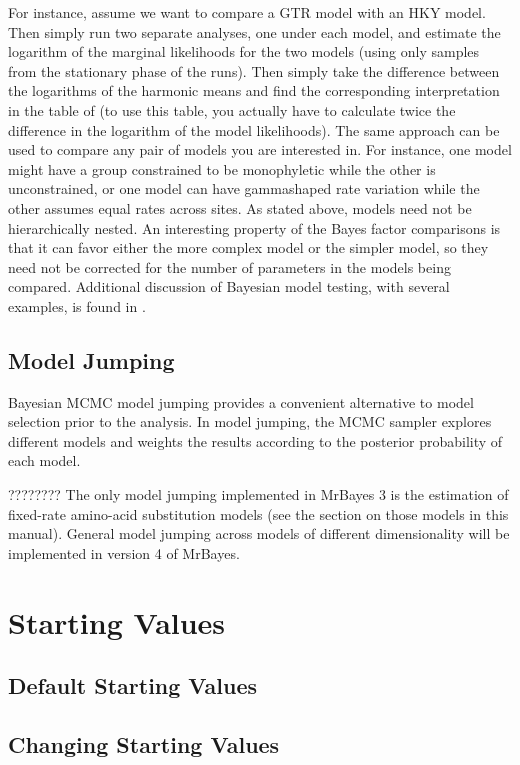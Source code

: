 \documentclass[12pt]{book}
\begin{document}
For instance, assume we want to compare a GTR model with an HKY model. Then simply run two separate
analyses, one under each model, and estimate the logarithm of the marginal likelihoods for the two
models (using only samples from the stationary phase of the runs). Then simply take the difference
between the logarithms of the harmonic means and find the corresponding interpretation in the table
of \citet{kass95} (to use this table, you actually have to calculate twice the difference in the
logarithm of the model likelihoods). The same approach can be used to compare any pair of models
you are interested in. For instance, one model might have a group constrained to be monophyletic
while the other is unconstrained, or one model can have gammashaped rate variation while the other
assumes equal rates across sites. As stated above, models need not be hierarchically nested. An
interesting property of the Bayes factor comparisons is that it can favor either the more complex
model or the simpler model, so they need not be corrected for the number of parameters in the
models being compared.  Additional discussion of Bayesian model testing, with several examples, is
found in \citet{nylander04}.


\subsection{Model Jumping}

Bayesian MCMC model jumping provides a convenient alternative to model selection prior to the
analysis. In model jumping, the MCMC sampler explores different models and weights the results
according to the posterior probability of each model.

???????? The only model jumping implemented in MrBayes 3 is the estimation of fixed-rate amino-acid
substitution models (see the section on those models in this manual). General model jumping across
models of different dimensionality will be implemented in version 4 of MrBayes.


\section{Starting Values}

\subsection{Default Starting Values}

\subsection{Changing Starting Values}
\end{document}
